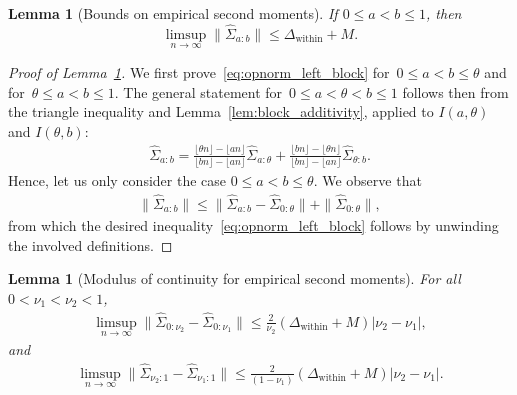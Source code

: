 \documentclass[10pt, letterpaper]{amsart}
\newtheorem{lem}[theorem]{Lemma}
\begin{document}
\begin{lem}[Bounds on empirical second moments]
\label{lem:opnorm_Sigma_ab}
 If $0\le a<b\le 1$, then
\begin{equation}\label{eq:opnorm_left_block}
\limsup_{n \to \infty} \|\widehat\Sigma_{a:b}\| \leq \Delta_{\text{within}} + M.
\end{equation}
\end{lem}

\begin{proof}[Proof of Lemma~\ref{lem:opnorm_Sigma_ab}]
We first prove~\eqref{eq:opnorm_left_block} for~$0 \leq a  < b \leq \theta$ and for~$\theta \leq a  < b \leq 1$.
The general statement for~$0 \leq a < \theta < b \leq 1$ follows then from the triangle inequality and  Lemma~\ref{lem:block_additivity}, applied to $I(a,\theta)$ and $I(\theta,b)$:
\begin{align}
    \widehat\Sigma_{a:b} = \frac{\lfloor \theta n \rfloor - \lfloor a n \rfloor}{\lfloor b n \rfloor - \lfloor a n \rfloor} \widehat\Sigma_{a:\theta} +  \frac{ \lfloor b n \rfloor  - \lfloor \theta n \rfloor }{\lfloor b n \rfloor - \lfloor a n \rfloor} \widehat\Sigma_{\theta:b} .
\end{align}
Hence, let us only consider the case $0 \leq a  < b \leq \theta$. We observe that
\begin{align}
       \|  \widehat\Sigma_{a:b} \| \leq \| \widehat\Sigma_{a:b}  -  \widehat\Sigma_{0:\theta}  \| + \|  \widehat\Sigma_{0:\theta}  \|,  
\end{align}
from which the desired inequality~\eqref{eq:opnorm_left_block} follows by unwinding the involved definitions.
\end{proof}

\begin{lem}[Modulus of continuity for empirical second moments]
\label{lem:modcont_cov}
For all  $0 < \nu_1 < \nu_2 < 1$,
\begin{align}
\label{eq:modcont_left}
\limsup_{n \to \infty}  \|\widehat\Sigma_{0:\nu_2 }-\widehat\Sigma_{0: \nu_1 } \|  \leq \frac{2}{\nu_2}  ( \Delta_{\text{within}} + M)  |\nu_2-\nu_1|,
\end{align}
and 
\begin{align}
\label{eq:modcont_right}
 \limsup_{n \to \infty} \|\widehat\Sigma_{\nu_2:1}-\widehat\Sigma_{\nu_1 :1} \| \leq \frac{2}{(1 - \nu_1)}  ( \Delta_{\text{within}} + M) |\nu_2-\nu_1|.
\end{align}

\end{lem}
\end{document}
